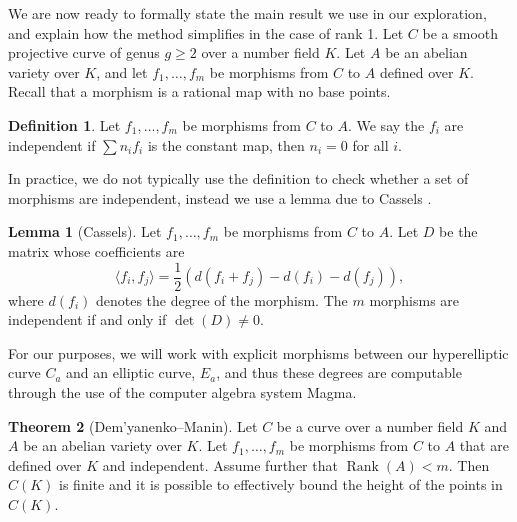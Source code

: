 \documentclass{article}
\theoremstyle{definition}
\newtheorem{theorem}{Theorem}[section]
\newtheorem{lemma}[theorem]{Lemma}
\newtheorem{definition}{Definition}
\DeclareMathOperator{\Rank}{Rank}
\begin{document}
\noindent We are now ready to formally state the main result we use in our exploration, and explain how the method simplifies in the case of rank 1. Let $C$ be a smooth projective curve of genus $g \geq 2$ over a number field $K$. Let $A$ be an abelian variety over $K$, and let $f_1, \dots, f_m$ be morphisms from $C$ to $A$ defined over $K$. Recall that a morphism is a rational map with no base points. 
\begin{definition}
    Let $f_1, \dots, f_m$ be morphisms from $C$ to $A$. We say the $f_i$ are independent if $\sum n_i f_i$ is the constant map, then $n_i = 0$ for all $i$. 
\end{definition}
\noindent In practice, we do not typically use the definition to check whether a set of morphisms are independent, instead we use a lemma due to Cassels \cite{cassels1968theorem}.
\begin{lemma}[Cassels]\label{casselslemma}
    Let $f_1, \dots, f_m$ be morphisms from $C$ to $A$. Let $D$ be the matrix whose coefficients are
    $$\langle f_i, f_j \rangle = \frac{1}{2} \left( d(f_i + f_j) - d(f_i) - d(f_j) \right),$$
    where $d(f_i)$ denotes the degree of the morphism. The $m$ morphisms are independent if and only if $\det(D) \neq 0$.
\end{lemma}
\noindent For our purposes, we will work with explicit morphisms between our hyperelliptic curve $C_a$ and an elliptic curve, $E_a$, and thus these degrees are computable through the use of the computer algebra system Magma. 
\begin{theorem}[Dem'yanenko--Manin]
    Let $C$ be a curve over a number field $K$ and $A$ be an abelian variety over $K$. Let $f_1, \dots, f_m$ be morphisms from $C$ to $A$ that are defined over $K$ and independent. Assume further that $\Rank(A) < m$. Then $C(K)$ is finite and it is possible to effectively bound the height of the points in $C(K)$.
\end{theorem}
\end{document}
